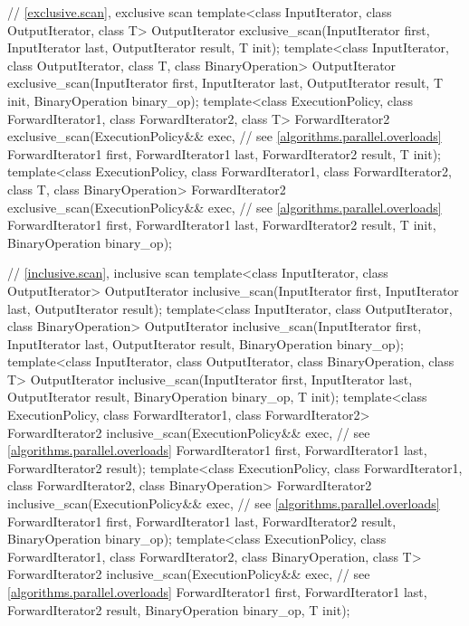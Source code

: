 \begin{codeblock}
{  // \ref{exclusive.scan}, exclusive scan
  template<class InputIterator, class OutputIterator, class T>
    OutputIterator
      exclusive_scan(InputIterator first, InputIterator last,
                     OutputIterator result, T init);
  template<class InputIterator, class OutputIterator, class T, class BinaryOperation>
    OutputIterator
      exclusive_scan(InputIterator first, InputIterator last,
                     OutputIterator result, T init, BinaryOperation binary_op);
  template<class ExecutionPolicy, class ForwardIterator1, class ForwardIterator2, class T>
    ForwardIterator2
      exclusive_scan(ExecutionPolicy&& exec,                    // see \ref{algorithms.parallel.overloads}
                     ForwardIterator1 first, ForwardIterator1 last,
                     ForwardIterator2 result, T init);
  template<class ExecutionPolicy, class ForwardIterator1, class ForwardIterator2, class T,
           class BinaryOperation>
    ForwardIterator2
      exclusive_scan(ExecutionPolicy&& exec,                    // see \ref{algorithms.parallel.overloads}
                     ForwardIterator1 first, ForwardIterator1 last,
                     ForwardIterator2 result, T init, BinaryOperation binary_op);

  // \ref{inclusive.scan}, inclusive scan
  template<class InputIterator, class OutputIterator>
    OutputIterator
      inclusive_scan(InputIterator first, InputIterator last,
                     OutputIterator result);
  template<class InputIterator, class OutputIterator, class BinaryOperation>
    OutputIterator
      inclusive_scan(InputIterator first, InputIterator last,
                     OutputIterator result, BinaryOperation binary_op);
  template<class InputIterator, class OutputIterator, class BinaryOperation, class T>
    OutputIterator
      inclusive_scan(InputIterator first, InputIterator last,
                     OutputIterator result, BinaryOperation binary_op, T init);
  template<class ExecutionPolicy, class ForwardIterator1, class ForwardIterator2>
    ForwardIterator2
      inclusive_scan(ExecutionPolicy&& exec,                    // see \ref{algorithms.parallel.overloads}
                     ForwardIterator1 first, ForwardIterator1 last,
                     ForwardIterator2 result);
  template<class ExecutionPolicy, class ForwardIterator1, class ForwardIterator2,
           class BinaryOperation>
    ForwardIterator2
      inclusive_scan(ExecutionPolicy&& exec,                    // see \ref{algorithms.parallel.overloads}
                     ForwardIterator1 first, ForwardIterator1 last,
                     ForwardIterator2 result, BinaryOperation binary_op);
  template<class ExecutionPolicy, class ForwardIterator1, class ForwardIterator2,
           class BinaryOperation, class T>
    ForwardIterator2
      inclusive_scan(ExecutionPolicy&& exec,                    // see \ref{algorithms.parallel.overloads}
                     ForwardIterator1 first, ForwardIterator1 last,
                     ForwardIterator2 result, BinaryOperation binary_op, T init);

}
\end{codeblock}
